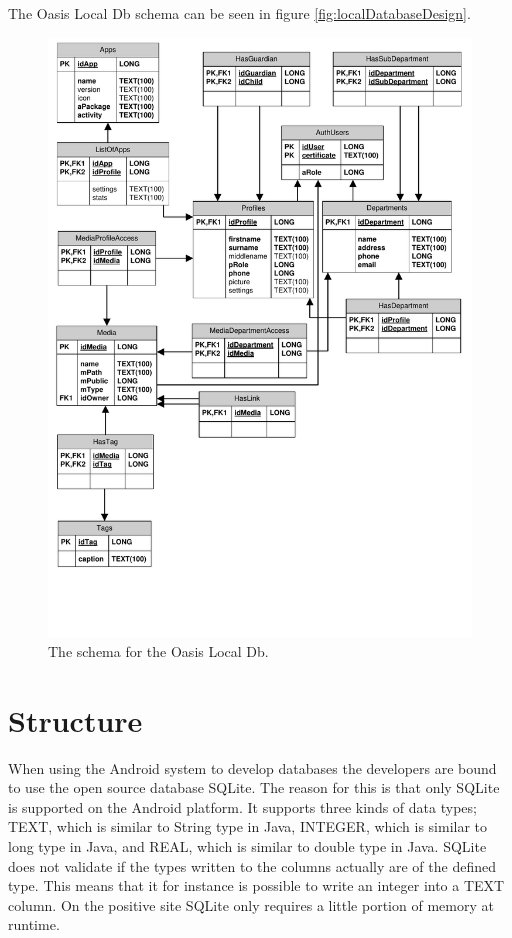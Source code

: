 The Oasis Local Db schema can be seen in figure \autoref{fig:localDatabaseDesign}.

\begin{figure}[H]
	\centering
		\includegraphics[width=\textwidth]{Images/LocalDatabaseDesign}
	\caption{The schema for the Oasis Local Db.}
	\label{fig:localDatabaseDesign}
\end{figure}

\section{Structure}
\label{sec:OasisStructure}
When using the Android system to develop databases the developers are bound to use the open source database SQLite. \cite{SQLite}
The reason for this is that only SQLite is supported on the Android platform. \cite{AndroidArchitecture}
It supports three kinds of data types; TEXT, which is similar to String type in Java, INTEGER, which is similar to long type in Java, and REAL, which is similar to double type in Java. \cite{SQLTypes}
SQLite does not validate if the types written to the columns actually are of the defined type.
This means that it for instance is possible to write an integer into a TEXT column.
On the positive site SQLite only requires a little portion of memory at runtime. \cite{SQLAbout} 

